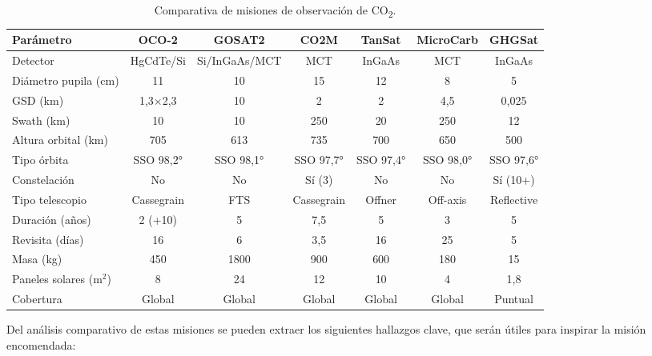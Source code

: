 \begin{landscape}
\begin{table}[p]
\centering
\caption{Comparativa de misiones de observación de CO\textsubscript{2}.}
\small
\begin{tabular}{lcccccc}
\toprule
\textbf{Parámetro} & \textbf{OCO-2} & \textbf{GOSAT2} & \textbf{CO2M} & \textbf{TanSat} & \textbf{MicroCarb} & \textbf{GHGSat} \\
\midrule
Detector & HgCdTe/Si  & Si/InGaAs/MCT & MCT & InGaAs & MCT & InGaAs \\
Diámetro pupila (cm) & 11 & 10 & 15 & 12 & 8 & 5 \\
GSD (km) & 1{,}3$\times$2{,}3 & 10 & 2 & 2 & 4{,}5 & 0{,}025 \\
Swath (km) & 10 & 10 & 250 & 20 & 250 & 12 \\
Altura orbital (km) & 705 & 613 & 735 & 700 & 650 & 500 \\
Tipo órbita & SSO 98{,}2° & SSO 98{,}1° & SSO 97{,}7° & SSO 97{,}4° & SSO 98{,}0° & SSO 97{,}6° \\
Constelación & No & No & Sí (3) & No & No & Sí (10+) \\
Tipo telescopio & Cassegrain & FTS & Cassegrain & Offner & Off-axis & Reflective \\
Duración (años) & 2 (+10) & 5 & 7{,}5 & 5 & 3 & 5 \\
Revisita (días) & 16 & 6 & 3{,}5 & 16 & 25 & 5 \\
Masa (kg) & 450 & 1800 & 900 & 600 & 180 & 15 \\
Paneles solares (m$^2$) & 8 & 24 & 12 & 10 & 4 & 1,8 \\
Cobertura & Global & Global & Global & Global & Global & Puntual \\
\bottomrule
\end{tabular}

\end{table}
\end{landscape}

Del análisis comparativo de estas misiones se pueden extraer los siguientes hallazgos clave, que serán útiles para inspirar la misión encomendada:

